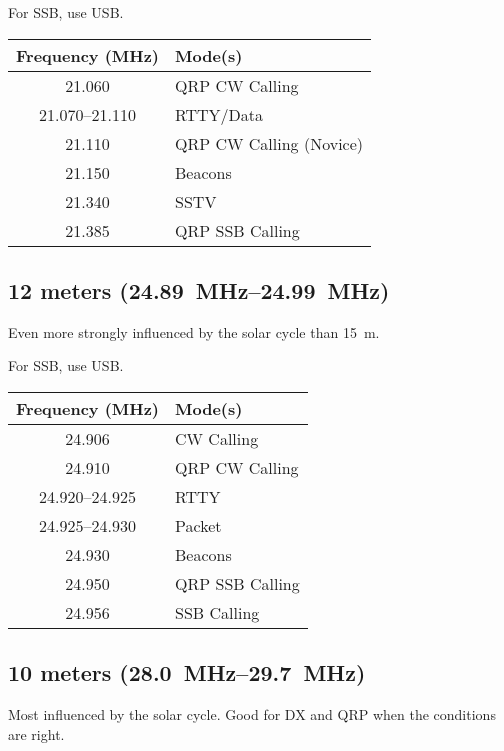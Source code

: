 \documentclass[11pt, onecolumn, table]{article}
\begin{document}
For SSB, use USB.
\begin{center}
  \begin{tabular}{S l}
    {Frequency (\si{\MHz})}		& Mode(s)					\\
    \midrule
    \num{21.060}				& QRP CW Calling			\\
    \numrange{21.070}{21.110}	& RTTY/Data					\\
    \num{21.110}				& QRP CW Calling (Novice)	\\
    \num{21.150}				& Beacons					\\
    \num{21.340}				& SSTV						\\
    \num{21.385}				& QRP SSB Calling			\\
  \end{tabular}
\end{center}


\newpage
\subsection{12 meters (\SIrange{24.89}{24.99}{\MHz})}
Even more strongly influenced by the solar cycle than \SI{15}{m}.

For SSB, use USB.
\begin{center}
  \begin{tabular}{S l}
    {Frequency (\si{\MHz})}			& Mode(s)			\\
    \midrule
    \num{24.906}					& CW Calling		\\
    \num{24.910}					& QRP CW Calling	\\
    \numrange{24.920}{24.925}		& RTTY				\\
    \numrange{24.925}{24.930}		& Packet			\\
    \num{24.930}					& Beacons			\\
    \num{24.950}					& QRP SSB Calling	\\
    \num{24.956}					& SSB Calling		\\
  \end{tabular}
\end{center}


\subsection{10 meters (\SIrange{28.0}{29.7}{\MHz})}
Most influenced by the solar cycle. Good for DX and QRP when
the conditions are right.
\end{document}
